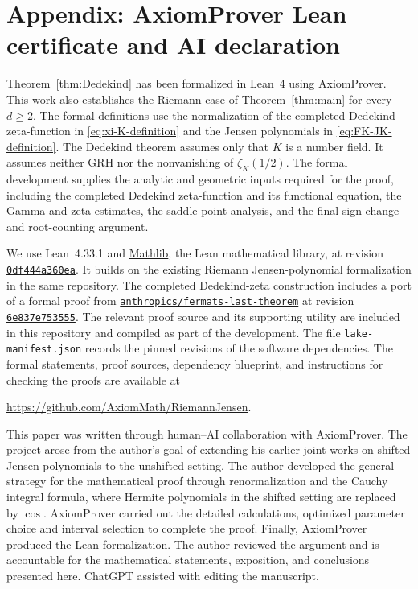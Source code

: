 \documentclass[11pt,reqno]{amsart}
\numberwithin{equation}{section}
\begin{document}
\section*{Appendix: AxiomProver Lean certificate and AI declaration}
\label{app:lean-certificate}

Theorem~\ref{thm:Dedekind} has been formalized in Lean~4 using
AxiomProver. 
This work also establishes
the Riemann case of Theorem~\ref{thm:main} for every $d\ge2$.
The formal definitions use the normalization of the completed
Dedekind zeta-function in \eqref{eq:xi-K-definition} and the
Jensen polynomials in \eqref{eq:FK-JK-definition}.
The Dedekind theorem assumes only that $K$ is a number field.
It assumes neither GRH nor the nonvanishing of
$\zeta_K(1/2)$. The formal development supplies the analytic
and geometric inputs required for the proof, including the
completed Dedekind zeta-function and its functional equation,
the Gamma and zeta estimates, the saddle-point analysis,
and the final sign-change and root-counting argument.


We use Lean~4.33.1 and
\href{https://github.com/leanprover-community/mathlib4}{Mathlib},
the Lean mathematical library, at revision
\href{https://github.com/leanprover-community/mathlib4/commit/0df444a360eaa60ab8c11dca51a86af692955474}
{\texttt{0df444a360ea}}.
It builds on the existing Riemann Jensen-polynomial
formalization in the same repository.
The completed Dedekind-zeta construction includes a port of
a formal proof from
\href{https://github.com/anthropics/fermats-last-theorem}
{\texttt{anthropics/fermats-last-theorem}}
at revision
\href{https://github.com/anthropics/fermats-last-theorem/tree/6e837e75355538c7f80bab5b956861e86c4eacc2}
{\texttt{6e837e753555}}.
The relevant proof source and its supporting utility are
included in this repository and compiled as part of the
development. The file \texttt{lake-manifest.json} records
the pinned revisions of the software dependencies.
The formal statements, proof sources, dependency blueprint,
and instructions for checking the proofs are available at
\begin{center}
\url{https://github.com/AxiomMath/RiemannJensen}.
\end{center}

This paper was written through human--AI collaboration with
AxiomProver. The project arose from the author's goal of
extending his earlier joint works on shifted Jensen polynomials
\cite{GORZ,GORTTW} to the unshifted setting.
The author developed the general strategy for the mathematical
proof through renormalization and the Cauchy integral formula, where Hermite polynomials in the shifted setting are replaced by $\cos$. 
AxiomProver carried out the detailed calculations, optimized
parameter choice and interval selection to complete the proof. Finally, AxiomProver
produced the Lean formalization. 
The author reviewed the argument and is accountable for the
mathematical statements, exposition, and conclusions presented
here. ChatGPT assisted with editing the manuscript.
\end{document}
